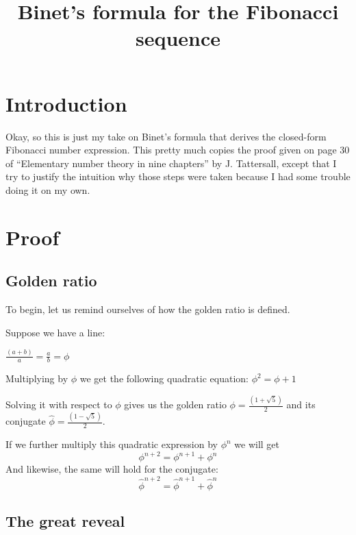 \documentclass{article}
\title{Binet's formula for the Fibonacci sequence}
\begin{document}
\maketitle

\section{Introduction}
Okay, so this is just my take on Binet's formula that derives the closed-form Fibonacci number expression. This pretty much copies the proof given on page 30 of ``Elementary number theory in nine chapters'' by J. Tattersall, except that I try to justify the intuition why those steps were taken because I had some trouble doing it on my own.

\section{Proof}

\subsection{Golden ratio}

To begin, let us remind ourselves of how the golden ratio is defined.

Suppose we have a line:



\bigskip

$\frac{(a + b)}{a} = \frac{a}{b} = \phi$

Multiplying by $\phi$ we get the following quadratic equation:
$\phi^2 = \phi + 1$

Solving it with respect to $\phi$ gives us the golden ratio $\phi = \frac{(1 + \sqrt{5})}{2}$ and its conjugate $\hat{\phi} = \frac{(1 - \sqrt{5})}{2}$.

If we further multiply this quadratic expression by $\phi^n$ we will get
$$\phi^{n + 2} = \phi^{n + 1} + \phi^{n}$$
And likewise, the same will hold for the conjugate:
$$\hat{\phi}^{n + 2} = \hat{\phi}^{n + 1} + \hat{\phi}^{n}$$

\subsection{The great reveal}
\end{document}
